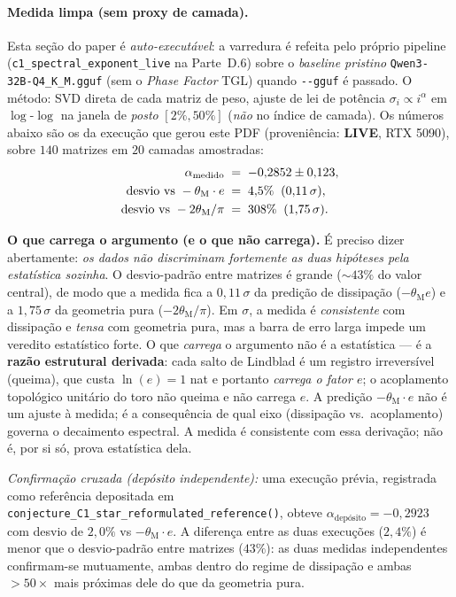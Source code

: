 \documentclass[12pt,a4paper]{article}
\newcommand{\thetaM}{\theta_{\text{M}}}
\newcommand{\TGL}{\textsc{TGL}}
\begin{document}
\paragraph{Medida limpa (sem proxy de camada).}
Esta seção do paper é \emph{auto-executável}: a varredura é refeita pelo
próprio pipeline (\texttt{c1\_spectral\_exponent\_live} na Parte~D.6) sobre o
\emph{baseline pristino} \texttt{Qwen3-32B-Q4\_K\_M.gguf} (sem o
\emph{Phase Factor} \TGL{}) quando \texttt{-{}-gguf} é passado.  O método: SVD
direta de cada matriz de peso, ajuste de lei de potência $\sigma_i \propto
i^{\alpha}$ em $\log$-$\log$ na janela de \emph{posto} $[2\%, 50\%]$
(\emph{não} no índice de camada).  Os números abaixo são os da execução que
gerou este PDF (proveniência: \textbf{LIVE}, RTX 5090), sobre $140$ matrizes em $20$ camadas amostradas:
\begin{align}
\alpha_{\text{medido}} \;&=\; -0{,}2852 \pm 0{,}123, \notag\\
\text{desvio vs } -\thetaM\cdot e \;&=\; 4{,}5\% \;\;(0{,}11\,\sigma), \notag\\
\text{desvio vs } -2\thetaM/\pi \;&=\; 308\% \;\;(1{,}75\,\sigma).
\label{eq:c1star-measured}
\end{align}

\noindent\textbf{O que carrega o argumento (e o que não carrega).}  É preciso
dizer abertamente: \emph{os dados não discriminam fortemente as duas hipóteses
pela estatística sozinha}.  O desvio-padrão entre matrizes é grande
($\sim 43\%$ do valor central), de modo que a medida fica a
$0{,}11\,\sigma$ da predição de dissipação ($-\thetaM e$) e a
$1{,}75\,\sigma$ da geometria pura ($-2\thetaM/\pi$).  Em $\sigma$, a
medida é \emph{consistente} com dissipação e \emph{tensa} com geometria pura,
mas a barra de erro larga impede um veredito estatístico forte.  O que
\emph{carrega} o argumento não é a estatística --- é a \textbf{razão
estrutural derivada}: cada salto de Lindblad é um registro irreversível
(queima), que custa $\ln(e) = 1$ nat e portanto \emph{carrega o fator $e$};
o acoplamento topológico unitário do toro não queima e não carrega $e$.  A
predição $-\thetaM\cdot e$ não é um ajuste à medida; é a consequência de qual
eixo (dissipação vs.\ acoplamento) governa o decaimento espectral.  A medida
é consistente com essa derivação; não é, por si só, prova estatística dela.

\noindent\emph{Confirmação cruzada (depósito independente):} uma execução
prévia, registrada como referência depositada em \texttt{conjecture\_C1\_star\_reformulated\_reference()}, obteve
$\alpha_{\text{depósito}} = -0{,}2923$
com desvio de $2{,}0\%$ vs $-\thetaM\cdot e$.
A diferença entre as duas execuções ($2{,}4\%$) é menor que o desvio-padrão entre matrizes
($43\%$): as duas medidas independentes confirmam-se mutuamente,
ambas dentro do regime de dissipação e ambas $> 50\times$ mais próximas dele do
que da geometria pura.
\end{document}
